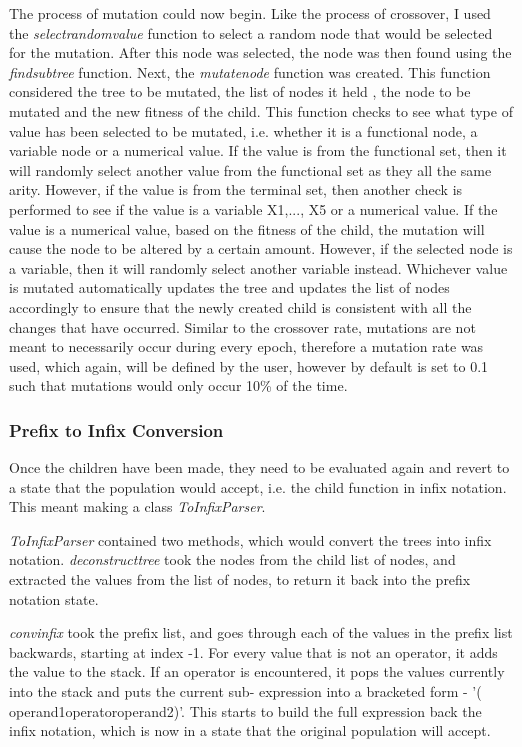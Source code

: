 \documentclass[11pt]{article}
\begin{document}
The process of mutation could now begin. Like the process of crossover, I used the \textit{select\textunderscore random\textunderscore value} function to select a random node that would be selected for the mutation. After this node was selected, the node was then found using the \textit{find\textunderscore subtree} function. Next, the \textit{mutate\textunderscore node} function was created. This function considered the tree to be mutated, the list of nodes it held , the node to be mutated and the new fitness of the child. This function checks to see what type of value has been selected to be mutated, i.e. whether it is a functional node,  a variable node or a numerical value. If the value is from the functional set, then it will randomly select another value from the functional set as they all the same arity. However, if the value is from the terminal set, then another check is performed to see if the value is a variable X1,..., X5 or a numerical value. If the value is a numerical value, based on the fitness of the child, the mutation will cause the node to be altered by a certain amount. However, if the selected node is a variable, then it will randomly select another variable instead. Whichever value is mutated automatically updates the tree and updates the list of nodes accordingly to ensure that the newly created child is consistent with all the changes that have occurred. Similar to the crossover rate, mutations are not meant to necessarily occur during every epoch, therefore a mutation rate was used, which again, will be defined by the user, however by default is set to 0.1 such that mutations would only occur 10\% of the time.
\subsubsection{Prefix to Infix Conversion}
Once the children have been made, they need to be evaluated again and revert to a state that the population would accept, i.e. the child function in infix notation. This meant making a class \textit{ToInfixParser}. 

\textit{ToInfixParser} contained two methods, which would convert the trees into infix notation. \textit{deconstruct\textunderscore tree} took the nodes from the child list of nodes, and extracted the values from the list of nodes, to return it back into the prefix notation state. 

\textit{conv\textunderscore infix} took the prefix list, and goes through each of the values in the prefix list backwards, starting at index -1. For every value that is not an operator, it adds the value to the stack. If an operator is encountered, it pops the values currently into the stack and puts the current sub- expression into a bracketed form - '( \textlangle{}operand1\textrangle{}\textlangle{}operator\textrangle{}\textlangle{}operand2\textrangle{})'. This starts to build the full expression back the infix notation, which is now in a state that the original population will accept.
\end{document}
